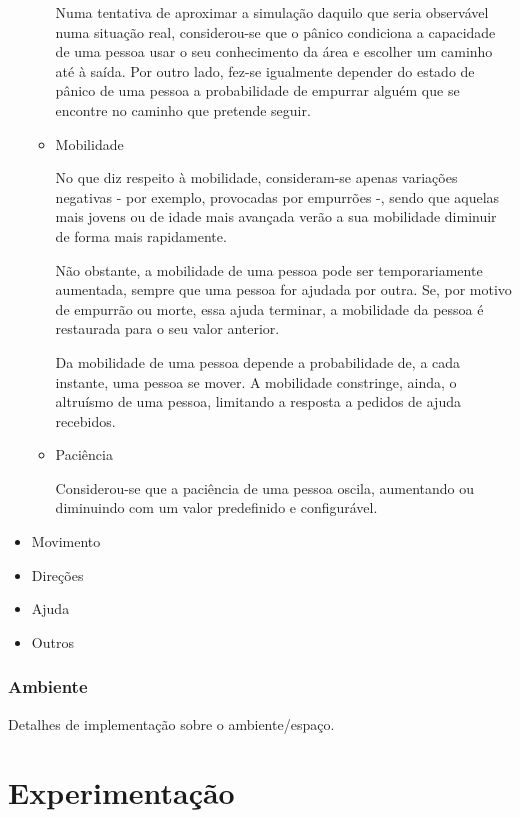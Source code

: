 \documentclass[12pt]{article}
\begin{document}
\begin{titlepage}
\begin{itemize}
\begin{itemize}
Numa tentativa de aproximar a simulação daquilo que seria observável numa situação real, considerou-se que o pânico condiciona a capacidade de uma pessoa usar o seu conhecimento da área e escolher um caminho até à saída. Por outro lado, fez-se igualmente depender do estado de pânico de uma pessoa a probabilidade de empurrar alguém que se encontre no caminho que pretende seguir.\newline


\item Mobilidade

No que diz respeito à mobilidade, consideram-se apenas variações negativas - por exemplo, provocadas por empurrões -, sendo que aquelas mais jovens ou de idade mais avançada verão a sua mobilidade diminuir de forma mais rapidamente.

Não obstante, a mobilidade de uma pessoa pode ser temporariamente aumentada, sempre que uma pessoa for ajudada por outra. Se, por motivo de empurrão ou morte, essa ajuda terminar, a mobilidade da pessoa é restaurada para o seu valor anterior.

Da mobilidade de uma pessoa depende a probabilidade de, a cada instante, uma pessoa se mover. A mobilidade constringe, ainda, o altruísmo de uma pessoa, limitando a resposta a pedidos de ajuda recebidos.\newline

\item Paciência

Considerou-se que a paciência de uma pessoa oscila, aumentando ou diminuindo com um valor predefinido e configurável.

\end{itemize}

\item Movimento

\item Direções

\item Ajuda

\item Outros

\end{itemize}

\subsubsection{Ambiente}
Detalhes de implementação sobre o ambiente/espaço.

\newpage
\section{Experimentação}


\end{titlepage}
\end{document}
